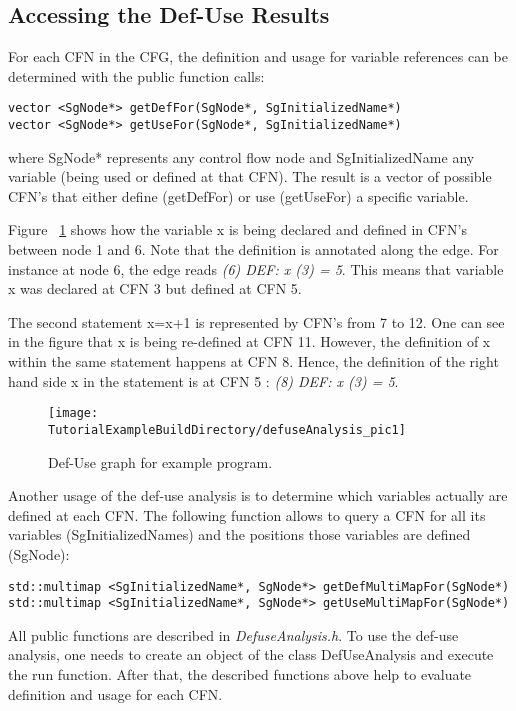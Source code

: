 \subsection{Accessing the Def-Use Results}
For each CFN in the CFG, the definition and usage for 
variable references can be determined with the public function calls:

\begin{verbatim}
vector <SgNode*> getDefFor(SgNode*, SgInitializedName*)
vector <SgNode*> getUseFor(SgNode*, SgInitializedName*)
\end{verbatim}

where SgNode* represents any control flow node and SgInitializedName any variable (being
used or defined at that CFN). The result is a vector of possible CFN's that either
define (getDefFor) or use (getUseFor) a specific variable.

Figure ~\ref{Tutorial:exampledefuse} shows how the variable x is being
declared and defined in CFN's between node 1 and 6. Note that the definition
is annotated along the edge. For instance at node 6, the edge reads 
\emph{(6) DEF: x (3) = 5}. This means that variable x was declared at CFN 3 but
defined at CFN 5.

The second statement x=x+1 is represented by CFN's from 7 to 12.
One can see in the figure that x is being re-defined at CFN 11. However,
the definition of x within the same statement happens at CFN 8. Hence, the 
definition of the right hand side x in the statement is at CFN 5 :
\emph{(8) DEF: x (3) = 5}.

\begin{figure}
\texttt{[image: \\TutorialExampleBuildDirectory/defuseAnalysis\_pic1]}
\caption{Def-Use graph for example program.}
\label{Tutorial:exampledefuse}
\end{figure}

Another usage of the def-use analysis is to determine which variables actually
are defined at each CFN. The following function allows to query a CFN for
all its variables (SgInitializedNames) and the positions those variables are defined
(SgNode):

\begin{verbatim}
std::multimap <SgInitializedName*, SgNode*> getDefMultiMapFor(SgNode*)
std::multimap <SgInitializedName*, SgNode*> getUseMultiMapFor(SgNode*)
\end{verbatim}

All public functions are described in \emph{DefuseAnalysis.h}. To use the def-use 
analysis, one needs to create an object of the class DefUseAnalysis and execute
the run function. After that, the described functions above help to evaluate 
definition and usage for each CFN.




